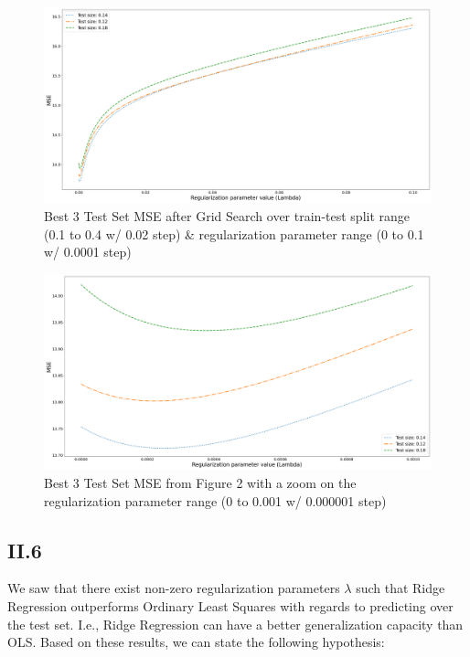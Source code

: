\documentclass{homework}
\begin{document}
\begin{figure}[H]
\begin{center}
\includegraphics[width=\textwidth]{images/grid_search_w1_best3.png}
\end{center}
\caption{Best 3 Test Set MSE after Grid Search over train-test split range (0.1 to 0.4 w/ 0.02 step) \& regularization parameter range (0 to 0.1 w/ 0.0001 step)}
\end{figure}

\begin{figure}[H]
\begin{center}
\includegraphics[width=\textwidth]{images/grid_search_w1_best3_focus.png}
\end{center}
\caption{Best 3 Test Set MSE from Figure 2 with a zoom on the regularization parameter range (0 to 0.001 w/ 0.000001 step)}
\end{figure}

\subsection*{II.6} 

We saw that there exist non-zero regularization parameters $\lambda$ such that Ridge Regression outperforms Ordinary Least Squares
with regards to predicting over the test set. I.e., Ridge Regression can have a better generalization capacity than OLS. Based
on these results, we can state the following hypothesis:
\end{document}
